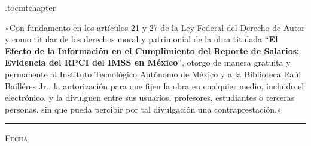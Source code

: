 \documentclass[10pt, oneside]{book}
\begin{document}








\newpage

\etocdepthtag.toc{mtchapter}


\thispagestyle{empty}

\vspace*{\fill}
\begingroup

\noindent
«Con fundamento en los artículos 21 y 27 de la Ley Federal del Derecho de Autor y como titular de los derechos moral y patrimonial de la obra titulada ``\textbf{El Efecto de la Información en el Cumplimiento del Reporte de Salarios: Evidencia del RPCI del IMSS en México}'', otorgo de manera gratuita y permanente al Instituto Tecnológico Autónomo de México y a la Biblioteca Raúl Bailléres Jr., la autorización para que fijen la obra en cualquier medio, incluido el electrónico, y la divulguen entre sus usuarios, profesores, estudiantes o terceras personas, sin que pueda percibir por tal divulgación una contraprestación.»



\centering 

\vspace{5em}

\rule[1em]{20em}{0.5pt} %

\textsc{Fecha}
 
\vspace{8em}
\end{document}
